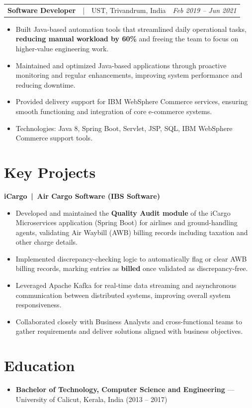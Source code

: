 \documentclass[a4paper,10pt]{article}
\makeatletter
\newcommand{\job}[3]{%
  \vspace{4pt}%
  \begin{tabularx}{\linewidth}{@{}X r@{}}
    \textbf{#1}\ \ {\color{subtle}|}\ \ {\color{subtle}#2} & {\small\itshape\color{subtle}#3}
  \end{tabularx}\par
}
\makeatother
\begin{document}
\job{Software Developer}{UST, Trivandrum, India}{Feb 2019 -- Jun 2021}
\begin{itemize}
  \item Built Java-based automation tools that streamlined daily operational tasks, \textbf{reducing manual workload by 60\%} and freeing the team to focus on higher-value engineering work.
  \item Maintained and optimized Java-based applications through proactive monitoring and regular enhancements, improving system performance and reducing downtime.
  \item Provided delivery support for IBM WebSphere Commerce services, ensuring smooth functioning and integration of core e-commerce systems.
  \item Technologies: Java 8, Spring Boot, Servlet, JSP, SQL, IBM WebSphere Commerce support tools.
\end{itemize}

\section{Key Projects}
\textbf{iCargo \,|\, Air Cargo Software (IBS Software)}
\begin{itemize}
  \item Developed and maintained the \textbf{Quality Audit module} of the iCargo Microservices application (Spring Boot) for airlines and ground-handling agents, validating Air Waybill (AWB) billing records including taxation and other charge details.
  \item Implemented discrepancy-checking logic to automatically flag or clear AWB billing records, marking entries as \textbf{billed} once validated as discrepancy-free.
  \item Leveraged Apache Kafka for real-time data streaming and asynchronous communication between distributed systems, improving overall system responsiveness.
  \item Collaborated closely with Business Analysts and cross-functional teams to gather requirements and deliver solutions aligned with business objectives.
\end{itemize}

\section{Education}
\begin{itemize}
  \item \textbf{Bachelor of Technology, Computer Science and Engineering} --- University of Calicut, Kerala, India \hfill (2013 -- 2017)
\end{itemize}
\end{document}
